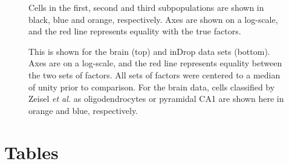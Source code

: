 \documentclass{bmcart}
\begin{document}
\begin{backmatter}
\begin{figure}[!h]
\caption{
    Cells in the first, second and third subpopulations are shown in black, blue and orange, respectively.
    Axes are shown on a log-scale, and the red line represents equality with the true factors.
}
\label{fig:sim_cluster_DE}
\end{figure}

\begin{figure}[!h]
\caption{
    This is shown for the brain (top) and inDrop data sets (bottom).
    Axes are on a log-scale, and the red line represents equality between the two sets of factors.
    All sets of factors were centered to a median of unity prior to comparison.
    For the brain data, cells classified by Zeisel \textit{et al.} as oligodendrocytes or pyramidal CA1 are shown here in orange and blue, respectively.
}   
\label{fig:real_comp}
\end{figure}



\section*{Tables}


\end{backmatter}
\end{document}
